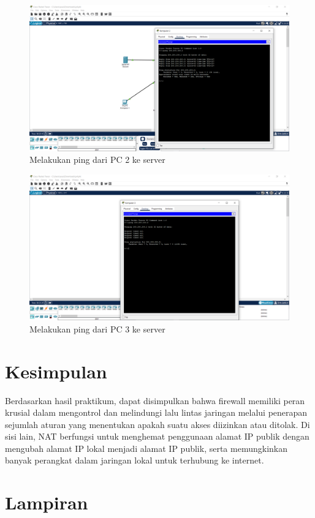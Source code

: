     \begin{figure}[H]
        \centering
        \includegraphics[width=0.5\linewidth]{P1/img/pingpc2.png}
        \caption{Melakukan ping dari PC 2 ke server}
        \label{fig:gambar}
    \end{figure}

    \begin{figure}[H]
        \centering
        \includegraphics[width=0.5\linewidth]{P1/img/pingpc3.png}
        \caption{Melakukan ping dari PC 3 ke server}
        \label{fig:gambar}
    \end{figure}

\section{Kesimpulan}
Berdasarkan hasil praktikum, dapat disimpulkan bahwa firewall memiliki peran krusial dalam mengontrol dan melindungi lalu lintas jaringan melalui penerapan sejumlah aturan yang menentukan apakah suatu akses diizinkan atau ditolak. Di sisi lain, NAT berfungsi untuk menghemat penggunaan alamat IP publik dengan mengubah alamat IP lokal menjadi alamat IP publik, serta memungkinkan banyak perangkat dalam jaringan lokal untuk terhubung ke internet.

\section{Lampiran}

